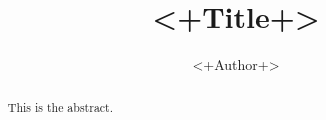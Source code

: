 \documentclass[11pt]{article}
\title{<+Title+>}
\author{<+Author+>}
\date{ }  %
\begin{document}
\maketitle
\begin{abstract}
	This is the abstract.
\end{abstract}
\tableofcontents



%

\clearpage  %


\end{document}
